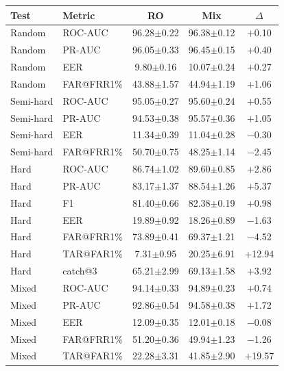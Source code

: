 \documentclass[11pt]{article}
\begin{document}
\begin{table}[!t]
\centering
\scriptsize
\begin{minipage}[t]{0.48\textwidth}
\centering
\begin{tabular}{l l c c c}
\toprule
\textbf{Test} & \textbf{Metric} & \textbf{RO} & \textbf{Mix} & \textbf{$\Delta$} \\
\midrule
Random    & ROC-AUC    & 96.28$\pm$0.22 & 96.38$\pm$0.12 & $+$0.10 \\
Random    & PR-AUC     & 96.05$\pm$0.33 & 96.45$\pm$0.15 & $+$0.40 \\
Random    & EER        & \phantom{0}9.80$\pm$0.16 & 10.07$\pm$0.24 & $+$0.27 \\
Random    & FAR@FRR1\% & 43.88$\pm$1.57 & 44.94$\pm$1.19 & $+$1.06 \\
\midrule
Semi-hard & ROC-AUC    & 95.05$\pm$0.27 & 95.60$\pm$0.24 & $+$0.55 \\
Semi-hard & PR-AUC     & 94.53$\pm$0.38 & 95.57$\pm$0.36 & $+$1.05 \\
Semi-hard & EER        & 11.34$\pm$0.39 & 11.04$\pm$0.28 & $-$0.30 \\
Semi-hard & FAR@FRR1\% & 50.70$\pm$0.75 & 48.25$\pm$1.14 & $-$2.45 \\
\midrule
Hard      & ROC-AUC    & 86.74$\pm$1.02 & 89.60$\pm$0.85 & $+$2.86 \\
Hard      & PR-AUC     & 83.17$\pm$1.37 & 88.54$\pm$1.26 & $+$5.37 \\
Hard      & F1         & 81.40$\pm$0.66 & 82.38$\pm$0.19 & $+$0.98 \\
Hard      & EER        & 19.89$\pm$0.92 & 18.26$\pm$0.89 & $-$1.63 \\
Hard      & FAR@FRR1\% & 73.89$\pm$0.41 & 69.37$\pm$1.21 & $-$4.52 \\
Hard      & TAR@FAR1\% & \phantom{0}7.31$\pm$0.95 & 20.25$\pm$6.91 & $+$12.94 \\
Hard      & catch@3    & 65.21$\pm$2.99 & 69.13$\pm$1.58 & $+$3.92 \\
\midrule
Mixed     & ROC-AUC    & 94.14$\pm$0.33 & 94.89$\pm$0.23 & $+$0.74 \\
Mixed     & PR-AUC     & 92.86$\pm$0.54 & 94.58$\pm$0.38 & $+$1.72 \\
Mixed     & EER        & 12.09$\pm$0.35 & 12.01$\pm$0.18 & $-$0.08 \\
Mixed     & FAR@FRR1\% & 51.20$\pm$0.36 & 49.94$\pm$1.23 & $-$1.26 \\
Mixed     & TAR@FAR1\% & 22.28$\pm$3.31 & 41.85$\pm$2.90 & $+$19.57 \\

\end{tabular}
\end{minipage}
\end{table}
\end{document}
